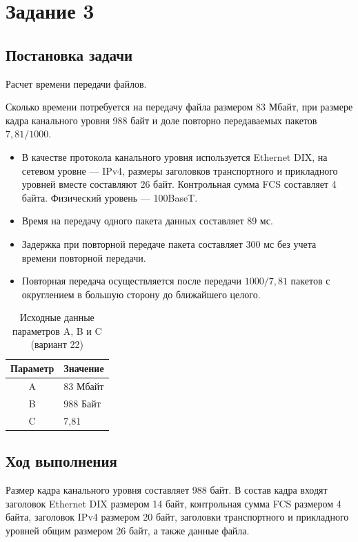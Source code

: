 \newpage
\section{Задание 3}
\subsection*{Постановка задачи}

Расчет времени передачи файлов.

Сколько времени потребуется на передачу файла размером 83 Мбайт,
при размере кадра канального уровня 988 байт и доле повторно
передаваемых пакетов $7{,}81/1000$.

\begin{itemize}
    \item В качестве протокола канального уровня используется
    Ethernet DIX, на сетевом уровне --- IPv4, размеры заголовков
    транспортного и прикладного уровней вместе составляют 26 байт.
    Контрольная сумма FCS составляет 4 байта.
    Физический уровень --- 100BaseT.

    \item Время на передачу одного пакета данных составляет 89 мс.
    \item Задержка при повторной передаче пакета составляет 300 мс без
    учета времени повторной передачи.
    \item Повторная передача осуществляется после передачи
    $1000/7{,}81$ пакетов с округлением в большую сторону до
    ближайшего целого.
\end{itemize}

\begin{table}[h!]
\centering
\begin{tabular}{|c|l|}
\hline
\textbf{Параметр} & \textbf{Значение} \\ \hline
A & 83 Мбайт \\ \hline
B & 988 Байт \\ \hline
C & 7,81 \\ \hline
\end{tabular}
\caption{Исходные данные параметров A, B и C (вариант 22)}
\label{tab:abc_values}
\end{table}

\subsection*{Ход выполнения}

Размер кадра канального уровня составляет 988 байт. В состав кадра
входят заголовок Ethernet DIX размером 14 байт, контрольная сумма
FCS размером 4 байта, заголовок IPv4 размером 20 байт, заголовки
транспортного и прикладного уровней общим размером 26 байт,
а также данные файла.

